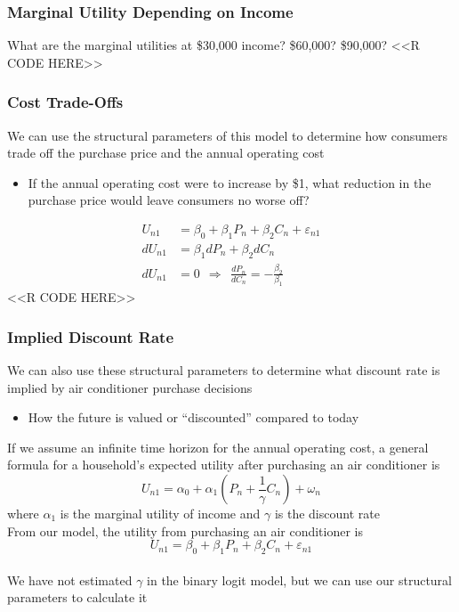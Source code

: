 \documentclass{beamer}
\begin{document}
\begin{frame}[fragile]\frametitle{Marginal Utility Depending on Income}
    What are the marginal utilities at \$30,000 income? \$60,000? \$90,000?
    <<R CODE HERE>>
\end{frame}

\begin{frame}[fragile]\frametitle{Cost Trade-Offs}
    We can use the structural parameters of this model to determine how consumers trade off the purchase price and the annual operating cost
    \begin{itemize}
        \item If the annual operating cost were to increase by \$1, what reduction in the purchase price would leave consumers no worse off?
    \end{itemize}
    \begin{align*}
        U_{n1} & = \beta_0 + \beta_1 P_n + \beta_2 C_n + \varepsilon_{n1} \\
        dU_{n1} & = \beta_1 dP_n + \beta_2 dC_n \\
        dU_{n1} & = 0 ~~ \Rightarrow ~~ \frac{dP_n}{dC_n}  = -\frac{\beta_2}{\beta_1}
    \end{align*}
    <<R CODE HERE>>
\end{frame}

\begin{frame}\frametitle{Implied Discount Rate}
    We can also use these structural parameters to determine what discount rate is implied by air conditioner purchase decisions
    \begin{itemize}
        \item How the future is valued or ``discounted'' compared to today
    \end{itemize}
    \vspace{2ex}
    If we assume an infinite time horizon for the annual operating cost, a general formula for a household's expected utility after purchasing an air conditioner is
    $$U_{n1} = \alpha_0 + \alpha_1 \left( P_n + \frac{1}{\gamma} C_n \right) + \omega_n$$
    where $\alpha_1$ is the marginal utility of income and $\gamma$ is the discount rate \\
    \vspace{2ex}
    From our model, the utility from purchasing an air conditioner is
    $$U_{n1} = \beta_0 + \beta_1 P_n + \beta_2 C_n + \varepsilon_{n1}$$ \\
    \vspace{1ex}
    We have not estimated $\gamma$ in the binary logit model, but we can use our structural parameters to calculate it
\end{frame}
\end{document}
